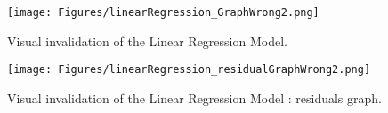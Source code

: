                  \begin{figure}[H]
                   \begin{minipage}{8cm}
                     \begin{center}
                       \texttt{[image: Figures/linearRegression\_GraphWrong2.png]}
                       \caption{Visual invalidation of the Linear Regression Model.}
                       \label{LMWrong2}
                     \end{center}
                   \end{minipage}
                   \hfill
                   \begin{minipage}{8cm}
                     \begin{center}
                       \texttt{[image: Figures/linearRegression\_residualGraphWrong2.png]}
                       \caption{Visual invalidation of the Linear Regression Model : residuals graph.}
                       \label{LMResidualWrong2}
                     \end{center}
                   \end{minipage}
                 \end{figure}
